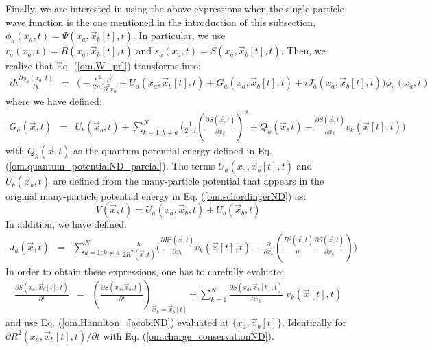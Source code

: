 \documentclass[onecolumn,nofootinbib, secnumarabic, amsmath, nobibnotes,12pt,aps,pra]{revtex4-1}
\newcommand{\eref}[1]{Eq. (\ref{#1})}
\begin{document}
Finally, we are interested in using the above expressions when the single-particle wave function is the one mentioned in the introduction of this subsection, $\phi_a(x_a,t) = \Psi(x_a,\vec x_b[t],t)$. In particular, we use $r_a(x_a,t) = R(x_{a},\vec x_{b}[t],t)$ and $s_a(x_a,t) = S(x_{a},\vec x_{b}[t],t)$. Then, we realize that \eref{om.W_prl} transforms into:
\begin{eqnarray}
\label{om.pseudoscho_prl}
i\hbar\frac{\partial \phi_{a}(x_{a},t)}{\partial t} &=& \bigg( -\frac
{\hbar^2} {2m}\frac {\partial^2}{\partial^2 {x_a}} + U_{a}(x_{a},\vec
x_{b}[t],t)+ G_{a}(x_{a},\vec x_{b}[t],t) + i J_{a}(x_{a},\vec x_{b}[t],t) \bigg) \phi_{a}(x_{a},t)
\end{eqnarray}
where we have defined:
\begin{eqnarray}
\label{om.G_prl}
G_{a}(\vec x,t) &=& U_b(\vec x_{b},t) + \sum_{k = 1;k\neq a}^{N} \Bigg( \frac {1} {2 \; m} \left (\frac {\partial S(\vec x,t)} {\partial x_k} \right)^2+ Q_k(\vec x,t) - \frac {\partial S(\vec x,t)} {\partial x_k} v_k(\vec x[t],t) \Bigg)
\end{eqnarray}
with $Q_k(\vec x,t)$ as the quantum potential energy defined in \eref{om.quantum_potentialND_parcial}. The terms \textit{$U_{a}(x_{a},\vec x_{b}[t],t)$} and \textit{$U_b(\vec x_{b},t)$} are defined from the many-particle potential that appears in the original many-particle potential energy in \eref{om.schordingerND} as:
\begin{equation}
\label{om.U_prl}
V(\vec x,t) = U_{a}(x_{a},\vec x_{b},t) + U_b(\vec x_{b},t)
\end{equation}
In addition, we have defined:
\begin{eqnarray}
\label{om.J_prl}
J_{a}(\vec x,t) &=& \sum_{k = 1;k\neq a}^{N} \frac {\hbar} {2R^2(\vec
x,t)} \Bigg( \frac {\partial R^2(\vec x,t)} {\partial x_k} v_k(\vec
x[t],t) - \frac {\partial} {\partial x_k} \left( \frac {R^2(\vec x,t)} {m} \frac {\partial S(\vec x,t)} {\partial x_k} \right) \Bigg)
\end{eqnarray}
In order to obtain these expressions, one has to carefully evaluate:
\begin{eqnarray}
\label{om.prlpas}
\frac {\partial S(x_a,\vec x_b[t],t)} {\partial t} &=& \left( \frac
{\partial S(x_a,\vec x_b,t)} {\partial t}\right)_{\vec x_b = \vec
x_b[t]}+ \sum_{k = 1}^{N}\frac {\partial S(x_a,\vec x_b[t],t)}{\partial x_k} \; v_k(\vec x[t],t)
\end{eqnarray}
and use \eref{om.Hamilton_JacobiND} evaluated at $\{x_a,\vec x_b[t]\}$. Identically for  $\partial R^2(x_a,\vec x_b[t],t)/\partial t$ with \eref{om.charge_conservationND}.
\end{document}
